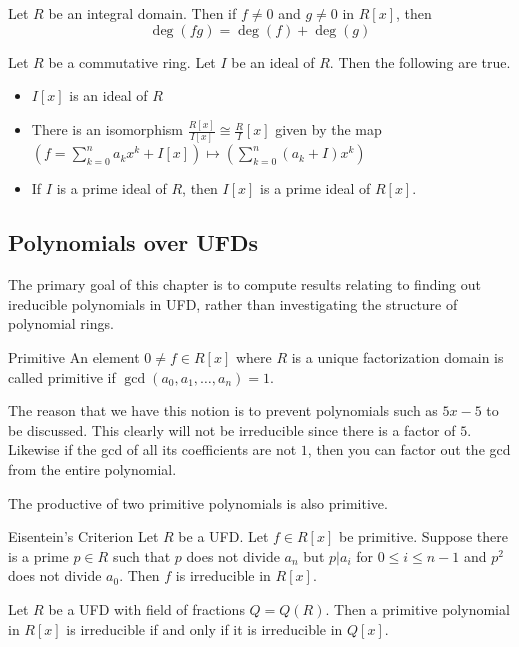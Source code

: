 \documentclass[a4paper]{article}
\begin{document}
\begin{prp}{}{} Let $R$ be an integral domain. Then if $f\neq 0$ and $g\neq 0$ in $R[x]$, then $$\deg(fg)=\deg(f)+\deg(g)$$
\end{prp}

\begin{prp}{}{} Let $R$ be a commutative ring. Let $I$ be an ideal of $R$. Then the following are true. 
\begin{itemize}
\item $I[x]$ is an ideal of $R$
\item There is an isomorphism $\frac{R[x]}{I[x]}\cong\frac{R}{I}[x]$ given by the map $\left(f=\sum_{k=0}^na_kx^k+I[x]\right)\mapsto\left(\sum_{k=0}^n(a_k+I)x^k\right)$
\item If $I$ is a prime ideal of $R$, then $I[x]$ is a prime ideal of $R[x]$. 
\end{itemize}
\end{prp}

\subsection{Polynomials over UFDs}
The primary goal of this chapter is to compute results relating to finding out ireducible polynomials in UFD, rather than investigating the structure of polynomial rings. 
\begin{defn}{Primitive}{} An element $0\neq f\in R[x]$ where $R$ is a unique factorization domain is called primitive if $\gcd(a_0,a_1,\dots,a_n)=1$. 
\end{defn}

The reason that we have this notion is to prevent polynomials such as $5x-5$ to be discussed. This clearly will not be irreducible since there is a factor of $5$. Likewise if the gcd of all its coefficients are not $1$, then you can factor out the gcd from the entire polynomial. 

\begin{prp}{}{} The productive of two primitive polynomials is also primitive. 
\end{prp}

\begin{prp}{Eisentein's Criterion}{} Let $R$ be a UFD. Let $f\in R[x]$ be primitive. Suppose there is a prime $p\in R$ such that $p$ does not divide $a_n$ but $p|a_i$ for $0\leq i\leq n-1$ and $p^2$ does not divide $a_0$. Then $f$ is irreducible in $R[x]$. 
\end{prp}

\begin{thm}{}{} Let $R$ be a UFD with field of fractions $Q=Q(R)$. Then a primitive polynomial in $R[x]$ is irreducible if and only if it is irreducible in $Q[x]$. 
\end{thm}
\end{document}
